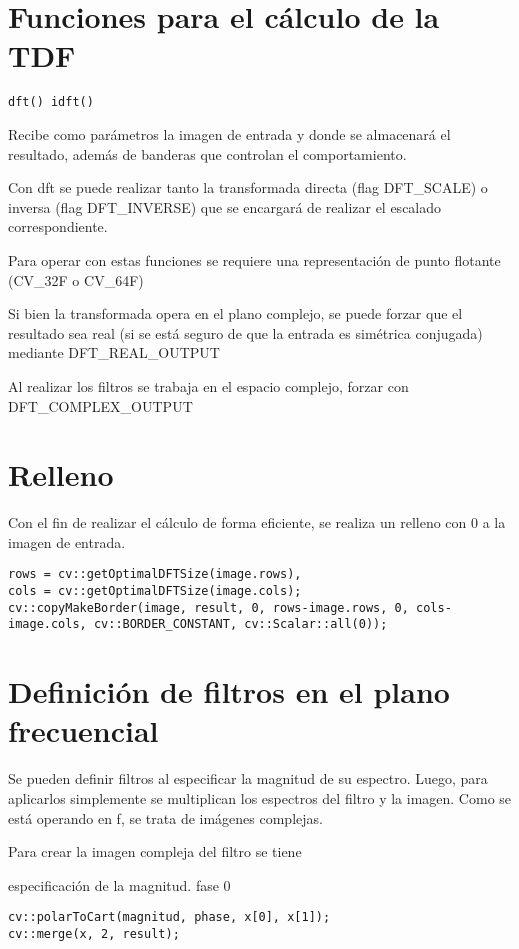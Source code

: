 \documentclass[oneside,a4paper]{book}
\begin{document}
	\section{Funciones para el cálculo de la TDF}
	\verb|dft() idft()|

	Recibe como parámetros la imagen de entrada y donde se almacenará el resultado, además de banderas que controlan el comportamiento.

	Con dft se puede realizar tanto la transformada directa (flag DFT\_SCALE) o inversa (flag DFT\_INVERSE)
	que se encargará de realizar el escalado correspondiente.

	Para operar con estas funciones se requiere una representación de punto flotante (CV\_32F o CV\_64F)

	Si bien la transformada opera en el plano complejo, se puede forzar que el resultado sea real (si se está seguro de que la entrada es simétrica conjugada) mediante DFT\_REAL\_OUTPUT

	Al realizar los filtros se trabaja en el espacio complejo, forzar con DFT\_COMPLEX\_OUTPUT


	\section{Relleno}
	Con el fin de realizar el cálculo de forma eficiente, se realiza un relleno con 0 a la imagen de entrada.

		\verb|rows = cv::getOptimalDFTSize(image.rows),|\\
		\verb|cols = cv::getOptimalDFTSize(image.cols);|\\
	\verb|cv::copyMakeBorder(image, result, 0, rows-image.rows, 0, cols-image.cols, cv::BORDER_CONSTANT, cv::Scalar::all(0));|

	\section{Definición de filtros en el plano frecuencial}
	Se pueden definir filtros al especificar la magnitud de su espectro.
	Luego, para aplicarlos simplemente se multiplican los espectros del filtro y la imagen.
	Como se está operando en f, se trata de imágenes complejas.

	Para crear la imagen compleja del filtro se tiene
	
	especificación de la magnitud.
	fase 0

	\verb|cv::polarToCart(magnitud, phase, x[0], x[1]);|\\
	\verb|cv::merge(x, 2, result);|
\end{document}
